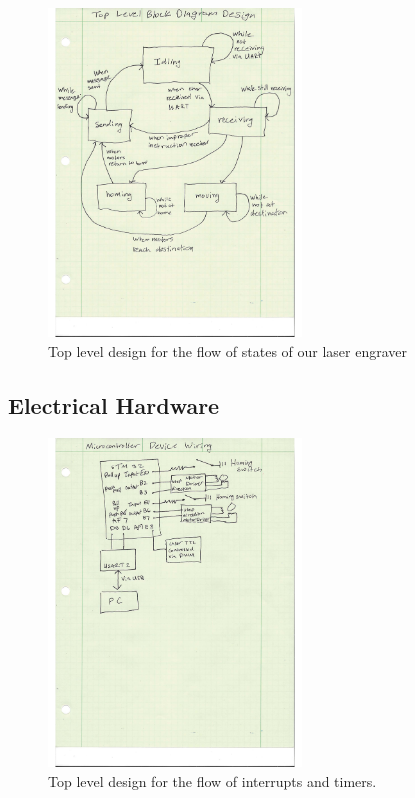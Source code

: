 \documentclass[11pt]{LaTeX-Classes/math-hw}
\begin{document}
 \begin{figure}[H]
   \begin{center}
     \includegraphics[width=0.6\textwidth]{blockdiagram}
     \caption{Top level design for the flow of states of our laser engraver}
     \label{fig:blockdiagram}
   \end{center}
 \end{figure}

\subsection{Electrical Hardware}

\begin{figure}[H]
	   \begin{center}
	     \includegraphics[width=0.6\textwidth]{mcwiringdiagram}
	     \caption{Top level design for the flow of interrupts and timers.}
	     \label{fig:mcwiringdiagram}
	   \end{center}
	 \end{figure}
\end{document}
